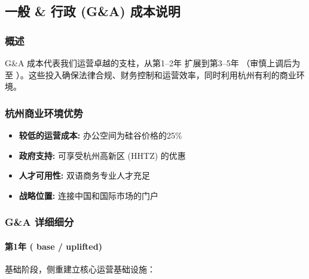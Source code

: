 \documentclass[11pt, a4paper, oneside]{article}
\begin{document}
\subsection{一般 \& 行政 (G\&A) 成本说明}

\subsubsection{概述}
G\&A 成本代表我们运营卓越的支柱，从第1--2年  扩展到第3--5年 （审慎上调后为  至 ）。这些投入确保法律合规、财务控制和运营效率，同时利用杭州有利的商业环境。

\subsubsection{杭州商业环境优势}
\begin{itemize}
    \item \textbf{较低的运营成本:} 办公空间为硅谷价格的25\%
    \item \textbf{政府支持:} 可享受杭州高新区 (HHTZ) 的优惠
    \item \textbf{人才可用性:} 双语商务专业人才充足
    \item \textbf{战略位置:} 连接中国和国际市场的门户
\end{itemize}

\subsubsection{G\&A 详细细分}

\paragraph{第1年 ( base /  uplifted)}
基础阶段，侧重建立核心运营基础设施：
\end{document}
